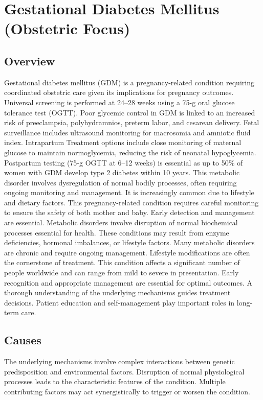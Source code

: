 \chapter{Gestational Diabetes Mellitus (Obstetric Focus)}
\label{sec:obstetric:Gestational Diabetes Mellitus}

\section{Overview}
Gestational diabetes mellitus (GDM) is a pregnancy-related condition requiring coordinated obstetric care given its implications for pregnancy outcomes. Universal screening is performed at 24--28 weeks using a 75-g oral glucose tolerance test (OGTT). Poor glycemic control in GDM is linked to an increased risk of preeclampsia, polyhydramnios, preterm labor, and cesarean delivery. Fetal surveillance includes ultrasound monitoring for macrosomia and amniotic fluid index. Intrapartum Treatment options include close monitoring of maternal glucose to maintain normoglycemia, reducing the risk of neonatal hypoglycemia. Postpartum testing (75-g OGTT at 6--12 weeks) is essential as up to 50\% of women with GDM develop type 2 diabetes within 10 years. This metabolic disorder involves dysregulation of normal bodily processes, often requiring ongoing monitoring and management. It is increasingly common due to lifestyle and dietary factors. This pregnancy-related condition requires careful monitoring to ensure the safety of both mother and baby. Early detection and management are essential. Metabolic disorders involve disruption of normal biochemical processes essential for health. These conditions may result from enzyme deficiencies, hormonal imbalances, or lifestyle factors. Many metabolic disorders are chronic and require ongoing management. Lifestyle modifications are often the cornerstone of treatment. This condition affects a significant number of people worldwide and can range from mild to severe in presentation. Early recognition and appropriate management are essential for optimal outcomes. A thorough understanding of the underlying mechanisms guides treatment decisions. Patient education and self-management play important roles in long-term care.
\section{Causes}
The underlying mechanisms involve complex interactions between genetic predisposition and environmental factors. Disruption of normal physiological processes leads to the characteristic features of the condition. Multiple contributing factors may act synergistically to trigger or worsen the condition.
